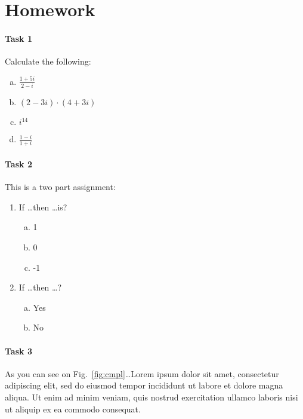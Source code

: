 \documentclass[a4paper,11pt]{article}
\theoremstyle{mytheor}
\begin{document}
\clearpage

\section{Homework}

\paragraph{Task 1}
Calculate the following:
\begin{multicols}{2}
\begin{enumerate}[(a)]
\item $\frac{1+5i}{2-i}$
\item $(2-3i)\cdot(4+3i)$
\item $i^{14}$
\item $\frac{1-i}{1+i}$
\end{enumerate}
\end{multicols}

\paragraph{Task 2}
This is a two part assignment:
\begin{enumerate}
\item If \ldots then \ldots is?
\begin{multicols}{3}
\begin{enumerate}[(a)]
\item 1
\item 0
\item -1
\end{enumerate}
\end{multicols}
\item If \ldots then \ldots ?
\begin{multicols}{2}
\begin{enumerate}[(a)]
\item Yes
\item No
\end{enumerate}
\end{multicols}
\end{enumerate}

\paragraph{Task 3}
As you can see on Fig.~\ref{fig:cmpl}\ldots Lorem ipsum dolor sit amet, consectetur adipiscing elit, sed do eiusmod tempor incididunt ut labore et dolore magna aliqua. Ut enim ad minim veniam, quis nostrud exercitation ullamco laboris nisi ut aliquip ex ea commodo consequat.
\end{document}
